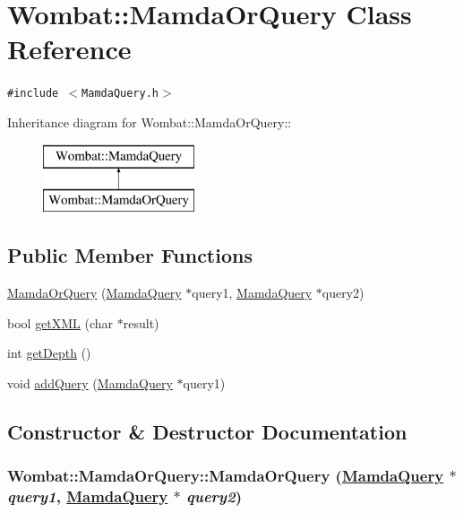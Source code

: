 \hypertarget{classWombat_1_1MamdaOrQuery}{
\section{Wombat::Mamda\-Or\-Query Class Reference}
\label{classWombat_1_1MamdaOrQuery}
}
{\tt \#include $<$Mamda\-Query.h$>$}

Inheritance diagram for Wombat::Mamda\-Or\-Query::\begin{figure}[H]
\begin{center}
\leavevmode
\includegraphics[height=2cm]{classWombat_1_1MamdaOrQuery}
\end{center}
\end{figure}
\subsection*{Public Member Functions}
\begin{CompactItemize}
\item 
\hyperlink{classWombat_1_1MamdaOrQuery_265a4c095519b4f87793abd00547ee03}{Mamda\-Or\-Query} (\hyperlink{classWombat_1_1MamdaQuery}{Mamda\-Query} $\ast$query1, \hyperlink{classWombat_1_1MamdaQuery}{Mamda\-Query} $\ast$query2)
\item 
bool \hyperlink{classWombat_1_1MamdaOrQuery_ea04c3b997cb90ba9df6232f304e3baf}{get\-XML} (char $\ast$result)
\item 
int \hyperlink{classWombat_1_1MamdaOrQuery_6c3978b27c90545a0271e3a9ffd40e38}{get\-Depth} ()
\item 
void \hyperlink{classWombat_1_1MamdaOrQuery_89aade080b1491f00222e2f7cb059569}{add\-Query} (\hyperlink{classWombat_1_1MamdaQuery}{Mamda\-Query} $\ast$query1)
\end{CompactItemize}


\subsection{Constructor \& Destructor Documentation}
\hypertarget{classWombat_1_1MamdaOrQuery_265a4c095519b4f87793abd00547ee03}{
\subsubsection[MamdaOrQuery]{\setlength{\rightskip}{0pt plus 5cm}Wombat::Mamda\-Or\-Query::Mamda\-Or\-Query (\hyperlink{classWombat_1_1MamdaQuery}{Mamda\-Query} $\ast$ {\em query1}, \hyperlink{classWombat_1_1MamdaQuery}{Mamda\-Query} $\ast$ {\em query2})}}
\label{classWombat_1_1MamdaOrQuery_265a4c095519b4f87793abd00547ee03}




